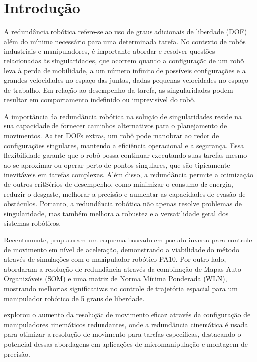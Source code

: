\chapter{Introdução}\label{cap:introduction}

A redundância robótica refere-se ao uso de graus adicionais de liberdade (DOF) além do mínimo necessário para uma determinada tarefa.
No contexto de robôs industriais e manipuladores, é importante abordar e resolver questões relacionadas às singularidades, que
ocorrem quando a configuração de um robô leva à perda de mobilidade, a um número infinito de possíveis configurações e a grandes
velocidades no espaço das juntas, dadas pequenas velocidades no espaço de trabalho. Em relação ao desempenho da tarefa, as singularidades
podem resultar em comportamento indefinido ou imprevisível do robô.

A importância da redundância robótica na solução de singularidades reside na sua capacidade de fornecer caminhos alternativos
para o planejamento de movimentos. Ao ter DOFs extras, um robô pode manobrar ao redor de configurações singulares, mantendo a
eficiência operacional e a segurança. Essa flexibilidade garante que o robô possa continuar executando suas tarefas mesmo ao
se aproximar ou operar perto de pontos singulares, que são tipicamente inevitáveis em tarefas complexas. Além disso, a redundância
permite a otimização de outros critSérios de desempenho, como minimizar o consumo de energia, reduzir o desgaste, melhorar a
precisão e aumentar as capacidades de evasão de obstáculos. Portanto, a redundância robótica não apenas resolve problemas de
singularidade, mas também melhora a robustez e a versatilidade geral dos sistemas robóticos.

Recentemente, \cite{li2023pseudo} propuseram um esquema baseado em pseudo-inversa para controle de movimento em nível de aceleração,
demonstrando a viabilidade do método através de simulações com o manipulador robótico PA10. Por outro lado, \cite{kuri2023som}
abordaram a resolução de redundância através da combinação de Mapas Auto-Organizáveis (SOM) e uma matriz de Norma Mínima Ponderada
(WLN), mostrando melhorias significativas no controle de trajetória espacial para um manipulador robótico de 5 graus de liberdade.

\cite{hammond2011configuring} explorou o aumento da resolução de movimento eficaz através da configuração de manipuladores cinemáticos
redundantes, onde a redundância cinemática é usada para otimizar a resolução de movimento para tarefas específicas, destacando o potencial dessas
abordagens em aplicações de micromanipulação e montagem de precisão.

